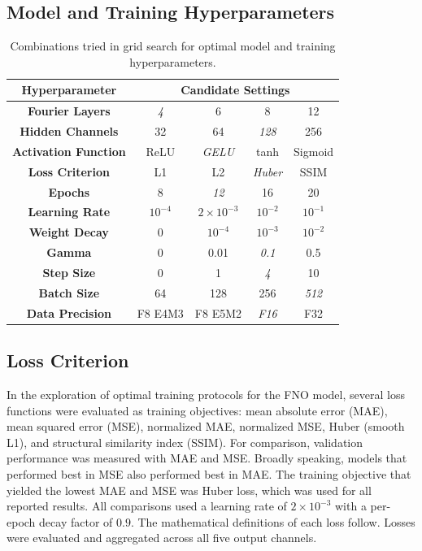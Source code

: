 \documentclass[preprint,review,12pt,numafflabel]{elsarticle}
\begin{document}
\subsection{Model and Training Hyperparameters}
\begin{table}[H]
    \centering
    \begin{tabular}{|c|c|c|c|c|}
        \hline
        \textbf{Hyperparameter} &
        \multicolumn{4}{c|}{\textbf{Candidate Settings}} \\ \hline
    
        \textbf{Fourier Layers} & \textit{4} & 6 & 8 & 12 \\ \hline
        \textbf{Hidden Channels} & 32 & 64 & \textit{128} & 256 \\ \hline
        \textbf{Activation Function} & ReLU & \textit{GELU} & tanh & Sigmoid \\ \hline
        \textbf{Loss Criterion} & L1 & L2 & \textit{Huber} & SSIM \\ \hline
        \textbf{Epochs} & 8 & \textit{12} & 16 & 20 \\ \hline
        \textbf{Learning Rate} & $10^{-4}$ & \textit{$2\times10^{-3}$} & $10^{-2}$ & $10^{-1}$ \\ \hline
        \textbf{Weight Decay} & 0 & \textit{$10^{-4}$} & $10^{-3}$ & $10^{-2}$ \\ \hline
        \textbf{Gamma} & 0 & 0.01 & \textit{0.1} & 0.5 \\ \hline
        \textbf{Step Size} & 0 & 1 & \textit{4} & 10 \\ \hline
        \textbf{Batch Size} & 64 & 128 & 256 & \textit{512} \\ \hline
        \textbf{Data Precision} & F8 E4M3 & F8 E5M2 & \textit{F16} & F32 \\ \hline
    \end{tabular}
    \caption{Combinations tried in grid search for optimal model and training hyperparameters.}
    \label{tab:training_hyperparameters}
\end{table}

\subsection{Loss Criterion}
In the exploration of optimal training protocols for the FNO model, several loss functions were evaluated as training objectives: mean absolute error (MAE), mean squared error (MSE), normalized MAE, normalized MSE, Huber (smooth L1), and structural similarity index (SSIM). For comparison, validation performance was measured with MAE and MSE. Broadly speaking, models that performed best in MSE also performed best in MAE. The training objective that yielded the lowest MAE and MSE was Huber loss, which was used for all reported results. All comparisons used a learning rate of $2\times10^{-3}$ with a per-epoch decay factor of $0.9$. The mathematical definitions of each loss follow. Losses were evaluated and aggregated across all five output channels. 
\end{document}
